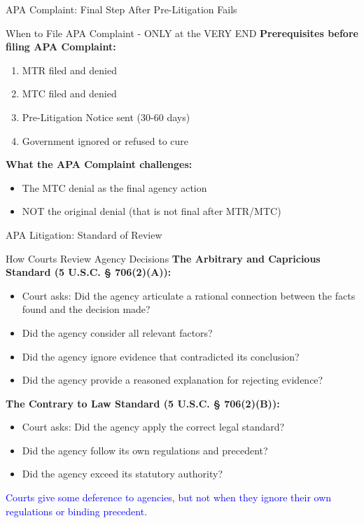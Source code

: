 \documentclass[11pt]{beamer}
\begin{document}
	\begin{frame}{APA Complaint: Final Step After Pre-Litigation Fails}
		\scriptsize
		\begin{block}{When to File APA Complaint - ONLY at the VERY END}
			\textbf{Prerequisites before filing APA Complaint:}
			\begin{enumerate}
				\item MTR filed and denied
				\item MTC filed and denied
				\item Pre-Litigation Notice sent (30-60 days)
				\item Government ignored or refused to cure
			\end{enumerate}
			\textbf{What the APA Complaint challenges:}
			\begin{itemize}
				\item The MTC denial as the final agency action
				\item NOT the original denial (that is not final after MTR/MTC)
			\end{itemize}
		\end{block}
	\end{frame}
	
	\begin{frame}{APA Litigation: Standard of Review}
		\scriptsize
		\begin{block}{How Courts Review Agency Decisions}
			\textbf{The Arbitrary and Capricious Standard (5 U.S.C. § 706(2)(A)):}
			\begin{itemize}
				\item Court asks: Did the agency articulate a rational connection between the facts found and the decision made?
				\item Did the agency consider all relevant factors?
				\item Did the agency ignore evidence that contradicted its conclusion?
				\item Did the agency provide a reasoned explanation for rejecting evidence?
			\end{itemize}
			\textbf{The Contrary to Law Standard (5 U.S.C. § 706(2)(B)):}
			\begin{itemize}
				\item Court asks: Did the agency apply the correct legal standard?
				\item Did the agency follow its own regulations and precedent?
				\item Did the agency exceed its statutory authority?
			\end{itemize}
			\textcolor{blue}{Courts give some deference to agencies, but not when they ignore their own regulations or binding precedent.}
		\end{block}
	\end{frame}
	
\end{document}
